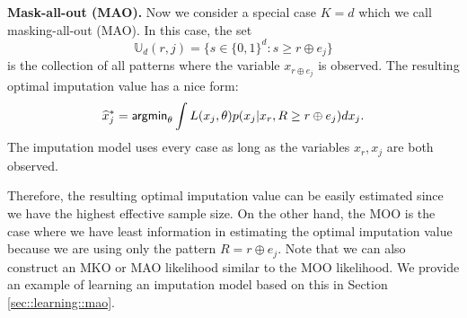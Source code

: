 \documentclass[aos, preprint]{imsart}
\theoremstyle{plain}
\theoremstyle{definition}
\let\hat\widehat
\begin{document}
\begin{appendix}
{\bf Mask-all-out (MAO).} Now we consider a special case $K=d$
which we call masking-all-out (MAO).
In this case, the set 
$$
\mathbb{U}_d(r, j) = \{s\in\{0,1\}^d: s\geq r\oplus e_j\}
$$
is the collection of all patterns where the variable $x_{r\oplus e_j}$ is observed. 
The resulting optimal imputation value has a nice form:
\begin{equation}
\hat x^*_j = {\sf argmin}_{\theta} \int L( x_j,\theta ) p(x_j|x_{r}, R\geq r \oplus e_j)dx_j.
\label{eq::opt::value::mao}
\end{equation}
The imputation model
uses every case as long as the variables $x_r, x_j$ are both observed. 


%
%
Therefore, the resulting optimal imputation value can be easily estimated
since we have the highest effective sample size. 
On the other hand, the MOO is the case where we have least information in
estimating the optimal imputation value because we are using only
the pattern $R = r \oplus e_j$.
Note that we can also construct an MKO or MAO likelihood similar to the MOO likelihood.
We provide an example of learning an imputation model based on this in Section \ref{sec::learning::mao}.





\end{appendix}
\end{document}
